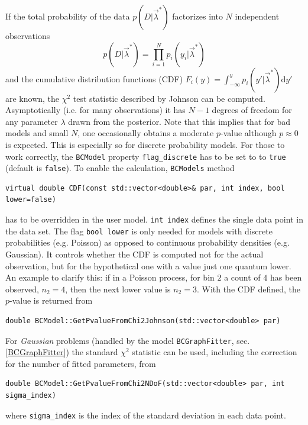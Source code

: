 \documentclass[11pt, a4paper]{article}
\begin{document}
\noindent
If the total probability of the data $p\left(D|\vec{\lambda}^{*}\right)$
 factorizes into $N$ independent observations
$$p\left(D|\vec{\lambda}^{*}\right) = \prod_{i=1}^N
p_i\left(y_i|\vec{\lambda}^{*}\right)$$ and the cumulative
distribution functions (CDF) $F_i(y)= \int_{-\infty}^{y}
p_i(y'|\vec{\lambda}^{*}) \mathrm{d }y'$ are known, the $\chi^2$ test
statistic described by Johnson \cite{Johnson_pValue} can be computed.
Asymptotically (i.e. for many observations) it has $N-1$ degrees of
freedom for any parameter $\lambda$ drawn from the posterior. Note
that this implies that for bad models and small $N$, one occasionally
obtains a moderate $p$-value although $p\approx 0 $ is expected. This
is especially so for discrete probability models. For those to work
correctly, the \texttt{BCModel} property \verb|flag_discrete| has to
be set to to \texttt{true} (default is \texttt{false}).  To enable the
calculation, \verb|BCModels| method
%
\begin{verbatim}
virtual double CDF(const std::vector<double>& par, int index, bool lower=false)
\end{verbatim}
%
has to be overridden in the user model.  \verb|int index| defines the
single data point in the data set. The flag \verb|bool lower| is only
needed for models with discrete probabilities (e.g. Poisson) as
opposed to continuous probability densities (e.g. Gaussian). It
controls whether the CDF is computed not for the actual observation,
but for the hypothetical one with a value just one quantum lower. An
example to clarify this: if in a Poisson process, for bin $2$ a count
of $4$ has been observed, $n_2=4$, then the next lower value is
$n_2=3$.  With the CDF defined, the $p$-value is returned from
\begin{verbatim}
double BCModel::GetPvalueFromChi2Johnson(std::vector<double> par)
\end{verbatim}

\noindent
For \textit{Gaussian} problems (handled by the model
\verb|BCGraphFitter|, sec. \ref{BCGraphFitter}) the standard $\chi^2$
statistic can be used, including the correction for the number of
fitted parameters, from
%
\begin{verbatim}
double BCModel::GetPvalueFromChi2NDoF(std::vector<double> par, int sigma_index)
\end{verbatim}
%
where \verb|sigma_index| is the index of the standard deviation in
each data point. \\
\end{document}
